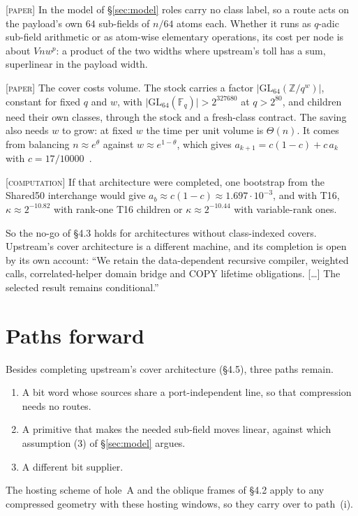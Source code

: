 \documentclass[11pt]{amsart}
\newcommand{\F}{\mathbb{F}}
\newcommand{\tagP}{\textsc{[paper]}}
\newcommand{\tagC}{\textsc{[computation]}}
\begin{document}
\tagP{} In the model of \S\ref{sec:model} roles carry no class label, so a route acts on the
payload's own $64$ sub-fields of $n/64$ atoms each. Whether it runs as $q$-adic sub-field arithmetic
or as atom-wise elementary operations, its cost per node is about $V n w^p$: a product of the two
widths where upstream's toll has a sum, superlinear in the payload width.

\tagP{} The cover costs volume. The stock carries a factor $\lvert
\mathrm{GL}_{64}(\mathbb{Z}/q^w)\rvert$, constant for fixed $q$ and $w$, with $\lvert
\mathrm{GL}_{64}(\F_q)\rvert > 2^{327680}$ at $q > 2^{80}$, and children need their own classes,
through the stock and a fresh-class contract. The saving also needs $w$ to grow: at fixed $w$ the
time per unit volume is $\Theta(n)$. It comes from balancing $n \approx e^{\theta}$ against $w
\approx e^{1-\theta}$, which gives $a_{k+1} = c(1-c) + c\,a_k$ with $c = 17/10000$~\cite{FP}.

\tagC{} If that architecture were completed, one bootstrap from the Shared50 interchange would give
$a_b \approx c(1-c) \approx 1.697 \cdot 10^{-3}$, and with T16, $\kappa \approx 2^{-10.82}$ with
rank-one T16 children or $\kappa \approx 2^{-10.44}$ with variable-rank ones.

So the no-go of \S4.3 holds for architectures without class-indexed covers. Upstream's cover
architecture is a different machine, and its completion is open by its own account: ``We retain
the data-dependent recursive compiler, weighted calls, correlated-helper domain bridge and COPY
lifetime obligations. [\dots] The selected result remains conditional.''~\cite{SR}

\section{Paths forward}

Besides completing upstream's cover architecture (\S4.5), three paths remain.
\begin{enumerate}
\item[(i)] A bit word whose sources share a port-independent line, so that compression needs no
  routes.
\item[(ii)] A primitive that makes the needed sub-field moves linear, against which assumption (3)
  of \S\ref{sec:model} argues.
\item[(iii)] A different bit supplier.
\end{enumerate}
The hosting scheme of hole~A and the oblique frames of \S4.2 apply to any compressed geometry
with these hosting windows, so they carry over to path~(i).
\end{document}
